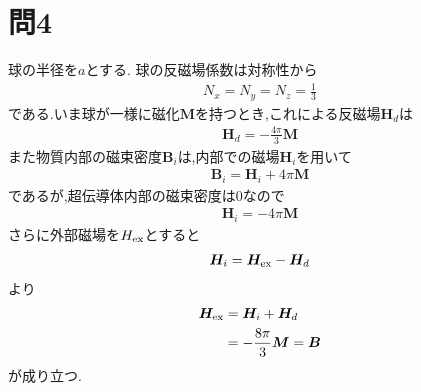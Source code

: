 \documentclass[uplatex,a4j,11pt,dvipdfmx]{jsarticle}
\begin{document}
\section*{問4}
球の半径を$a$とする.
球の反磁場係数は対称性から
\begin{align}
  N_x=N_y=N_z=\frac{1}{3}
\end{align}
である.いま球が一様に磁化$\bm M$を持つとき,これによる反磁場${\bm H}_d$は
\begin{align}
  {\bm H}_d=-\frac{4\pi}{3}{\bm M}
\end{align}
また物質内部の磁束密度${\bm B}_i$は,内部での磁場${\bm H}_i$を用いて
\begin{align}
  {\bm B}_i={\bm H}_i+4\pi{\bm M}
\end{align}
であるが,超伝導体内部の磁束密度は0なので
\begin{align}
  {\bm H}_i=-4\pi{\bm M}
\end{align}
さらに外部磁場を$H_{\rm ex}$とすると
\begin{align}
  {\bm H}_i={\bm H}_{\rm ex}-{\bm H}_d
\end{align}
より
\begin{align}
  \begin{split}
    {\bm H}_{\rm ex}&={\bm H}_i+{\bm H}_d\\
    &=-\frac{8\pi}{3}{\bm M}={\bm B}
  \end{split}
\end{align}
が成り立つ.
\end{document}
